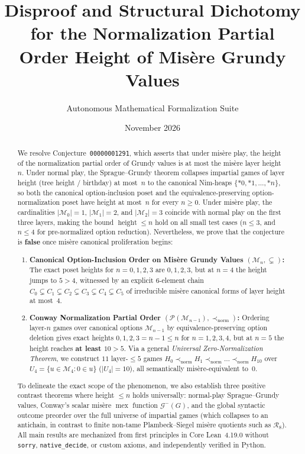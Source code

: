 \documentclass[11pt]{amsart}
\title[Normalization Partial Order Height of Mis\`ere Grundy Values]{Disproof and Structural Dichotomy for the Normalization Partial Order Height of Mis\`ere Grundy Values}
\author{Autonomous Mathematical Formalization Suite}
\date{November 2026}
\theoremstyle{definition}
\theoremstyle{remark}
\newcommand{\Mlayer}{\mathcal{M}}
\newcommand{\Glayer}{\mathcal{G}}
\DeclareMathOperator{\mex}{mex}
\DeclareMathOperator{\height}{height}
\begin{document}
\begin{abstract}
We resolve Conjecture~\texttt{00000001291}, which asserts that under mis\`ere play, the height of the normalization partial order of Grundy values is at most the mis\`ere layer height~$n$. Under normal play, the Sprague--Grundy theorem collapses impartial games of layer height (tree height / birthday) at most~$n$ to the canonical Nim-heaps $\{*0, *1, \dots, *n\}$, so both the canonical option-inclusion poset and the equivalence-preserving option-normalization poset have height at most~$n$ for every $n \ge 0$. Under mis\`ere play, the cardinalities $|\Mlayer_0|=1$, $|\Mlayer_1|=2$, and $|\Mlayer_2|=3$ coincide with normal play on the first three layers, making the bound $\height \le n$ hold on all small test cases ($n \le 3$, and $n \le 4$ for pre-normalized option reduction). Nevertheless, we prove that the conjecture is \textbf{false} once mis\`ere canonical proliferation begins:
\begin{enumerate}
  \item \textbf{Canonical Option-Inclusion Order on Mis\`ere Grundy Values $(\Mlayer_n,\subsetneq)$:} The exact poset heights for $n=0,1,2,3$ are $0,1,2,3$, but at \textbf{$n=4$} the height jumps to \textbf{$5 > 4$}, witnessed by an explicit $6$-element chain $C_0 \subsetneq C_1 \subsetneq C_2 \subsetneq C_3 \subsetneq C_4 \subsetneq C_5$ of irreducible mis\`ere canonical forms of layer height at most~$4$.
  \item \textbf{Conway Normalization Partial Order $(\mathcal{P}(\Mlayer_{n-1}), \prec_{\mathrm{norm}})$:} Ordering layer-$n$ games over canonical options $\Mlayer_{n-1}$ by equivalence-preserving option deletion gives exact heights $0,1,2,3 = n-1 \le n$ for $n=1,2,3,4$, but at \textbf{$n=5$} the height reaches \textbf{at least $10 > 5$}. Via a general \emph{Universal Zero-Normalization Theorem}, we construct $11$ layer-$\le 5$ games $H_0 \prec_{\mathrm{norm}} H_1 \prec_{\mathrm{norm}} \dots \prec_{\mathrm{norm}} H_{10}$ over $U_4 = \{u \in \Mlayer_4 : 0 \in u\}$ ($|U_4|=10$), all semantically mis\`ere-equivalent to~$0$.
\end{enumerate}
To delineate the exact scope of the phenomenon, we also establish three positive contrast theorems where height $\le n$ holds universally: normal-play Sprague--Grundy values, Conway's scalar mis\`ere $\mex$ function $\Glayer^-(G)$, and the global syntactic outcome preorder over the full universe of impartial games (which collapses to an antichain, in contrast to finite non-tame Plambeck--Siegel mis\`ere quotients such as $\mathcal{R}_8$). All main results are mechanized from first principles in Core Lean~4.19.0 without \texttt{sorry}, \texttt{native\_decide}, or custom axioms, and independently verified in Python.
\end{abstract}
\end{document}
